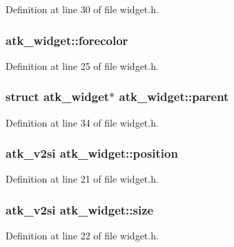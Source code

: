 Definition at line 30 of file widget.\+h.

\hypertarget{structatk__widget_a303ad035289ebebf801d76720ff37065}{
\subsubsection[{forecolor}]{ atk\+\_\+widget\+::forecolor}}\label{structatk__widget_a303ad035289ebebf801d76720ff37065}


Definition at line 25 of file widget.\+h.

\hypertarget{structatk__widget_ae82913e03415708354bc5088890f7b19}{
\subsubsection[{parent}]{\setlength{\rightskip}{0pt plus 5cm}struct {\bf atk\+\_\+widget}$\ast$ atk\+\_\+widget\+::parent}}\label{structatk__widget_ae82913e03415708354bc5088890f7b19}


Definition at line 34 of file widget.\+h.

\hypertarget{structatk__widget_a24145b1d5428ec2211dabe700dfe2076}{
\subsubsection[{position}]{\setlength{\rightskip}{0pt plus 5cm}atk\+\_\+v2si atk\+\_\+widget\+::position}}\label{structatk__widget_a24145b1d5428ec2211dabe700dfe2076}


Definition at line 21 of file widget.\+h.

\hypertarget{structatk__widget_a03bb553a3c4b8b7523a56bcebd489fbc}{
\subsubsection[{size}]{\setlength{\rightskip}{0pt plus 5cm}atk\+\_\+v2si atk\+\_\+widget\+::size}}\label{structatk__widget_a03bb553a3c4b8b7523a56bcebd489fbc}


Definition at line 22 of file widget.\+h.

